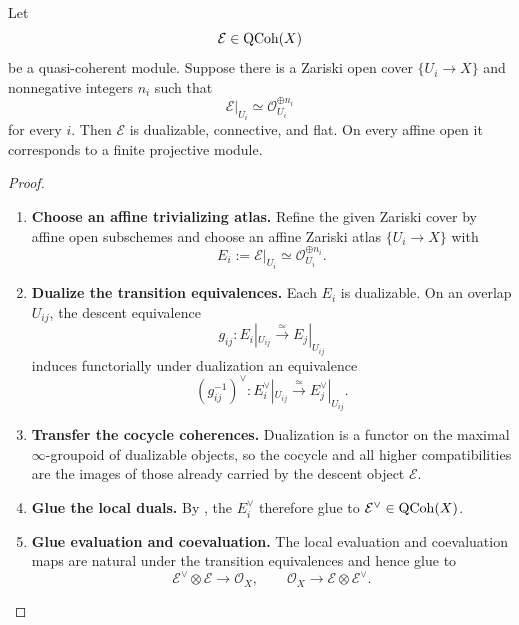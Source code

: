 \begin{proposition}
\label{prop:locally-free-finite-projective}
Let
\[
    \mathcal E
    \in
    \operatorname{QCoh}(X)
\]
be a quasi-coherent module. Suppose there is a Zariski open cover \(\{U_i\to X\}\) and nonnegative
integers \(n_i\) such that
\[
    \mathcal E|_{U_i}
    \simeq
    \mathcal O_{U_i}^{\oplus n_i}
\]
for every \(i\). Then \(\mathcal E\) is dualizable, connective, and flat. On
every affine open it corresponds to a finite projective module.
\end{proposition}

\begin{proof}
\leavevmode
\begin{enumerate}[label=\textup{(\arabic*)}]
    \item \textbf{Choose an affine trivializing atlas.}
    Refine the given Zariski cover by affine open subschemes and choose an
    affine Zariski atlas \(\{U_i\to X\}\) with
    \[
        E_i:=\mathcal E|_{U_i}
        \simeq
        \mathcal O_{U_i}^{\oplus n_i}.
    \]

    \item \textbf{Dualize the transition equivalences.}
    Each \(E_i\) is dualizable. On an overlap \(U_{ij}\), the descent
    equivalence
    \[
        g_{ij}:E_i|_{U_{ij}}\xrightarrow{\simeq}E_j|_{U_{ij}}
    \]
    induces functorially under dualization an equivalence
    \[
        (g_{ij}^{-1})^\vee:
        E_i^\vee|_{U_{ij}}
        \xrightarrow{\simeq}
        E_j^\vee|_{U_{ij}}.
    \]

    \item \textbf{Transfer the cocycle coherences.}
    Dualization is a functor on the maximal \(\infty\)-groupoid of
    dualizable objects, so the cocycle and all higher compatibilities are the
    images of those already carried by the descent object \(\mathcal E\).

    \item \textbf{Glue the local duals.}
    By , the \(E_i^\vee\) therefore glue to
    \(\mathcal E^\vee\in\operatorname{QCoh}(X)\).

    \item \textbf{Glue evaluation and coevaluation.}
    The local evaluation and coevaluation maps are natural under the
    transition equivalences and hence glue to
    \[
        \mathcal E^\vee\otimes\mathcal E\longrightarrow\mathcal O_X,
        \qquad
        \mathcal O_X\longrightarrow\mathcal E\otimes\mathcal E^\vee.
    \]


\end{enumerate}
\end{proof}
